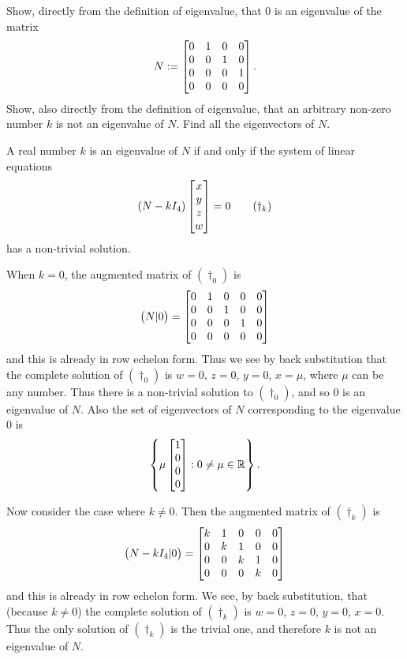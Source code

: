 \documentclass[a4paper]{amsart}
\renewenvironment{solution}{\SolutionInline}{\endSolutionInline}
\begin{document}
\begin{exercise}\label{ex-evectors-iii}
 Show, directly from the definition of eigenvalue, that 0 is an eigenvalue
 of the matrix
 \[ N := \left[\begin{matrix} 
          0 & 1 & 0 & 0 \\
          0 & 0 & 1 & 0 \\
          0 & 0 & 0 & 1 \\
          0 & 0 & 0 & 0
         \end{matrix}\right].
 \]
 Show, also directly from the definition of eigenvalue, that an arbitrary non-zero
 number $k$ is not an eigenvalue of $N$.
 Find all the eigenvectors of $N$.
\end{exercise}
\begin{solution}
 A real number $k$ is an eigenvalue of $N$ if and only if the
 system of linear equations \[(N-kI_4)\left[\begin{matrix}
 x\\y\\z\\w\end{matrix}\right] = 0 \tag{$\dagger_k$}\] has a non-trivial
 solution.

 When $k = 0$, the augmented matrix of $(\dagger_0)$ is
 $$\big(N|0\big)= \left[\begin{matrix}
 0&1&0&0&0\\0&0&1&0&0\\0&0&0&1&0\\0&0&0&0&0\end{matrix}\right]$$ and this
 is already in row echelon form. Thus we see by back substitution
 that the complete solution of $(\dagger_0)$ is $w = 0$, $z = 0$,
 $y= 0$, $x = \mu$, where $\mu$ can be any number. Thus there is a
 non-trivial solution to $(\dagger_0)$, and so $0$ is an eigenvalue
 of $N$. Also the set of eigenvectors of $N$ corresponding to the
 eigenvalue $0$ is
 $$
 \left\{ \mu\left[\begin{matrix} 1\\0\\0\\0\end{matrix}\right] : 0 \neq \mu
 \in {\mathbb{R}} \right\}.
 $$

 Now consider the case where $k \neq 0$. Then the augmented matrix
 of $(\dagger_k)$ is $$\big(N-kI_4|0\big) = \left[\begin{matrix}
 k&1&0&0&0\\0&k&1&0&0\\0&0&k&1&0\\0&0&0&k&0\end{matrix}\right]$$ and this
 is already in row echelon form. We see, by back substitution, that
 (because $k \neq 0$) the complete solution of $(\dagger_k)$ is $w
 = 0$, $z = 0$, $y = 0$, $x=0$. Thus the only solution of
 $(\dagger_k)$ is the trivial one, and therefore $k$ is not an
 eigenvalue of $N$.
\end{solution}
\end{document}
